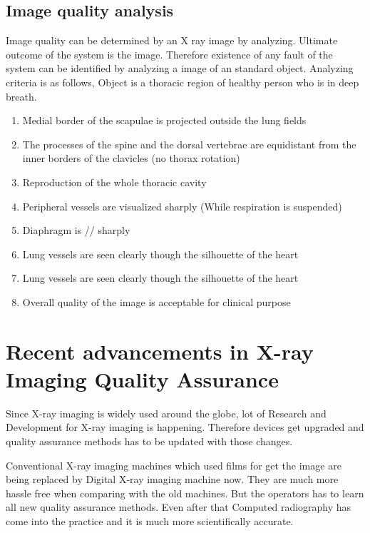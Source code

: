 \documentclass[12pt]{article}
\begin{document}
\subsection{Image quality analysis}

Image quality can be determined by an X ray image by analyzing. Ultimate outcome of the system is the image. Therefore existence of any fault of the system can be identified by analyzing a image of an standard object.
Analyzing criteria is as follows,
Object is a thoracic region of healthy person who is in deep breath.
\begin{enumerate}
    \item Medial border of the scapulae is projected outside the lung fields
    \item The processes of the spine and the
dorsal vertebrae are equidistant from the inner borders of the clavicles (no thorax rotation)
    \item Reproduction of the whole thoracic cavity
    \item Peripheral vessels are visualized sharply (While respiration is suspended)
    \item Diaphragm is // sharply
    \item Lung vessels are seen clearly though the silhouette of the heart
    \item Lung vessels are seen clearly though the silhouette of the heart
    \item Overall quality of the image is acceptable for clinical purpose
\end{enumerate}
\pagebreak

\section{Recent advancements in X-ray Imaging Quality Assurance }
Since X-ray imaging is widely used around the globe, lot of Research and Development for X-ray imaging is happening. Therefore devices get upgraded and quality assurance methods has to be updated with those changes. \newline 

Conventional X-ray imaging machines which used films for get the image are being replaced by Digital X-ray imaging machine now. They are much more hassle free when comparing with the old machines. But the operators has to learn all new quality assurance methods. Even after that Computed radiography has come into the practice and it is much more scientifically accurate.  \newline
\end{document}
